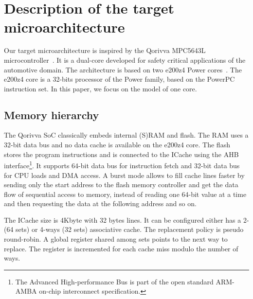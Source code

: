 \section{Description of the target microarchitecture}
\label{sec:architecture}

Our target microarchitecture is inspired by the Qorivva MPC5643L microcontroller~\cite{mpc5643lrefMan}.
It is a dual-core developed for safety critical applications of the automotive domain.
The architecture is based on two e200z4 Power cores~\cite{e200z4Man}. 
The e200z4 core is a 32-bits processor of the Power family, based on the PowerPC instruction set.
In this paper, we focus on the model of one core.


\subsection{Memory hierarchy}
\label{sec:architecture:memory}

The Qorivva SoC classically embeds internal (S)RAM and flash. 
The RAM uses a 32-bit data bus and no data cache is available on the e200z4 core. 
The flash stores the program instructions and is connected to the ICache using the AHB interface\footnote{The Advanced High-performance Bus is part of the open standard ARM-AMBA on-chip interconnect specification.}. It supports 64-bit data bus for instruction fetch and 32-bit data bus for CPU loads and DMA access. 
A burst mode allows to  fill cache lines faster by sending only the start address to the flash memory controller and get the data flow of sequential access to memory, instead of reading one 64-bit value at a time and then requesting the data at the following address and so on.

The ICache size is 4Kbyte with 32 bytes lines. 
It can be configured either has a 2- (64 sets) or 4-ways (32 sets) associative cache. 
The replacement policy is pseudo round-robin. 
A global register shared among sets points to the next way to replace. 
The register is incremented for each cache miss %
modulo the number of ways.

